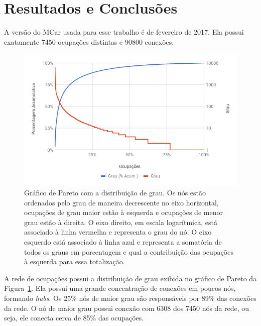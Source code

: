 \documentclass[
  article,
  11pt,
  a4paper,
  english,
  brazil,
  sumario=tradicional]{abntex2}
\begin{document}
\section{Resultados e Conclusões} \label{sec:resultados}



A versão do MCar usada para esse trabalho é de fevereiro de 2017. Ela possui exatamente 7450 ocupações distintas e 90800 conexões.

\begin{figure}[htb]
  \centering
  \includegraphics[width=0.9\linewidth]{pareto-ocupacoes.png}
  \caption{Gráfico de Pareto com a distribuição de grau. Os nós estão ordenados pelo grau de maneira decrescente no eixo horizontal, ocupações de grau maior estão à esquerda e ocupações de menor grau estão à direita. O eixo direito, em escala logarítmica, está associado à linha vermelha e representa o grau do nó. O eixo esquerdo está associado à linha azul e representa a somatória de todos os graus em porcentagem e qual a contribuição das ocupações à esquerda para essa totalização.}
  \label{fig:pareto-ocupacoes}
\end{figure}

A rede de ocupações possui a distribuição de grau exibida no gráfico de Pareto da Figura~\ref{fig:pareto-ocupacoes}. Ela possui uma grande concentração de conexões em poucos nós, formando \textit{hubs}. Os 25\% nós de maior grau são responsáveis por 89\% das conexões da rede. O nó de maior grau possui conexão com 6308 dos 7450 nós da rede, ou seja, ele conecta cerca de 85\% das ocupações.
\end{document}
